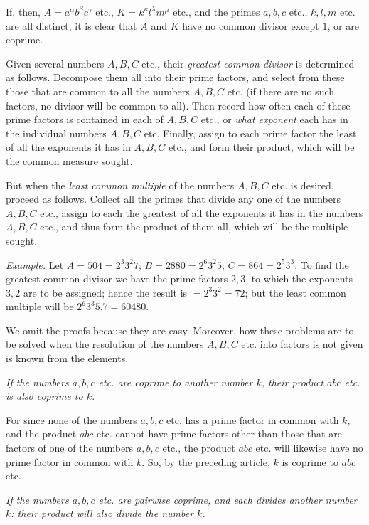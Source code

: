 If, then, $A=a^\alpha b^\beta c^\gamma$ etc., $K=k^\kappa l^\lambda m^{\mu}$ etc., and the primes $a, b, c$ etc., $k, l, m$ etc. are all distinct, it is clear that $A$ and $K$ have no common divisor except $1$, or are coprime.

Given several numbers $A, B, C$ etc., their \emph{greatest common divisor} is determined as follows. Decompose them all into their prime factors, and select from these those that are common to all the numbers $A, B, C$ etc. (if there are no such factors, no divisor will be common to all). Then record how often each of these prime factors is contained in each of $A, B, C$ etc., or \emph{what exponent} each has in the individual numbers $A, B, C$ etc. Finally, assign to each prime factor the least of all the exponents it has in $A, B, C$ etc., and form their product, which will be the common measure sought.

But when the \emph{least common multiple} of the numbers $A, B, C$ etc. is desired, proceed as follows. Collect all the primes that divide any one of the numbers $A, B, C$ etc., assign to each the greatest of all the exponents it has in the numbers $A, B, C$ etc., and thus form the product of them all, which will be the multiple sought.

\emph{Example.} Let $A=504=2^3 3^2 7$; $B=2880=2^6 3^2 5$; $C=864=2^5 3^3$. To find the greatest common divisor we have the prime factors $2, 3$, to which the exponents $3, 2$ are to be assigned; hence the result is $=2^3 3^2=72$; but the least common multiple will be $2^6 3^3 5.7=60480$.

We omit the proofs because they are easy. Moreover, how these problems are to be solved when the resolution of the numbers $A, B, C$ etc. into factors is not given is known from the elements.

\emph{If the numbers $a, b, c$ etc. are coprime to another number $k$, their product $abc$ etc. is also coprime to $k$.}

For since none of the numbers $a, b, c$ etc. has a prime factor in common with $k$, and the product $abc$ etc. cannot have prime factors other than those that are factors of one of the numbers $a, b, c$ etc., the product $abc$ etc. will likewise have no prime factor in common with $k$. So, by the preceding article, $k$ is coprime to $abc$ etc.

\emph{If the numbers $a, b, c$ etc. are pairwise coprime, and each divides another number $k$: their product will also divide the number $k$.}

